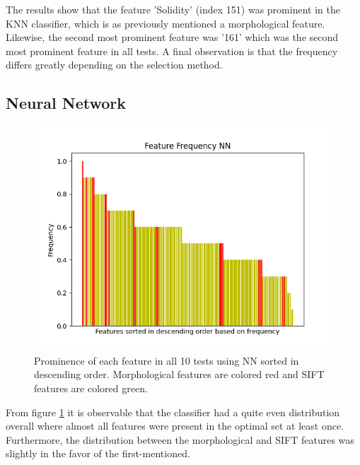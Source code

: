 \documentclass{kththesis}
\begin{document}
\newpage

The results show that the feature 'Solidity' (index 151) was prominent in the KNN classifier, which is as previously mentioned a morphological feature. Likewise, the second most prominent feature was '161' which was the second most prominent feature in all tests. A final observation is that the frequency differs greatly depending on the selection method.


\newpage

\subsection{Neural Network}

\begin{figure}[h!]
  \centering
  \includegraphics[scale=0.8]{figures/nn_all_freqs.png}
  \caption{Prominence of each feature in all 10 tests using NN sorted in descending order. Morphological features are colored red and SIFT features are colored green.}
  \label{fig:freq_nn}
\end{figure}

\newpage

From figure \ref{fig:freq_nn} it is observable that the classifier had a quite even distribution overall where almost all features were present in the optimal set at least once. Furthermore, the distribution between the morphological and SIFT features was slightly in the favor of the first-mentioned.  
\end{document}
